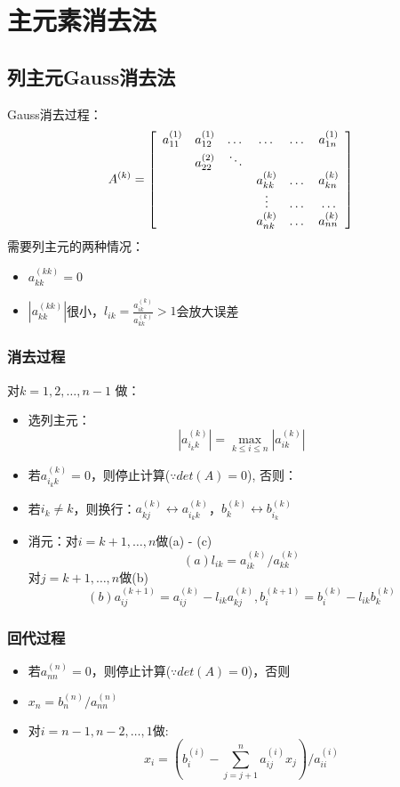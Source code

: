 \documentclass[a4paper]{article}
\begin{document}
\section{主元素消去法}
\subsection{列主元Gauss消去法}
Gauss消去过程：
$$
A^{(k)}=\left[
\begin{array}{c c c c c c}
a^{(1)}_{11} & a^{(1)}_{12} & \dots & \dots &\dots &a^{(1)}_{1n} \\
~ & a^{(2)}_{22} & \ddots & ~ & ~ & ~ \\
~ & ~ & ~ & a^{(k)}_{kk} & \dots & a^{(k)}_{kn} \\
~ & ~ & ~ & \vdots        & \dots & \dots         \\
~ & ~ & ~ & a^{(k)}_{nk} & \dots & a^{(k)}_{nn} \\ 
\end{array}\right]
$$
需要列主元的两种情况：
\begin{itemize}
\item $a^{(kk)}_{kk} = 0$
\item $|a^{(kk)}_{kk}|$很小，$l_{ik}=\frac{a^{(k)}_{ik}}{a^{(k)}_{kk}} > 1$会放大误差
\end{itemize}
\subsubsection{消去过程}
对$k=1, 2, \dots, n-1$ 做：
\begin{itemize}
\item 选列主元：$$|a_{i_kk}^{(k)}| = \max_{k \le i \le n} |a^{(k)}_{ik}|$$
\item 若$a_{i_kk}^{(k)} = 0$，则停止计算($\because det(A) = 0$), 否则：
\item 若$i_k \neq k$，则换行：$a_{kj}^{(k)} \leftrightarrow a_{i_kk}^{(k)}$，$b^{(k)}_k \leftrightarrow b^{(k)}_{i_k}$
\item 消元：对$i=k+1, \dots, n$做(a) - (c)
$$
(a) l_{ik} = a_{ik}^{(k)} / a_{kk}^{(k)} 
$$
对$j=k+1, \dots, n$做(b)
$$(b) a_{ij}^{(k+1)} = a_{ij}^{(k)} - l_{ik}a_{kj}^{(k)}, b^{(k+1)}_i = b^{(k)}_i - l_{ik}b^{(k)}_k $$
\end{itemize}

\subsubsection{回代过程}
\begin{itemize}
\item 若$a^{(n)}_{nn} = 0$，则停止计算($\because det(A) = 0$)，否则
\item $x_n = b^{(n)}_n / a^{(n)}_{nn}$
\item 对$i=n-1, n-2, \dots, 1$做:
$$x_i = (b^{(i)}_i - \sum^n_{j=j+1}a^{(i)}_{ij}x_j) / a^{(i)}_{ii}$$
\end{itemize}
\end{document}
